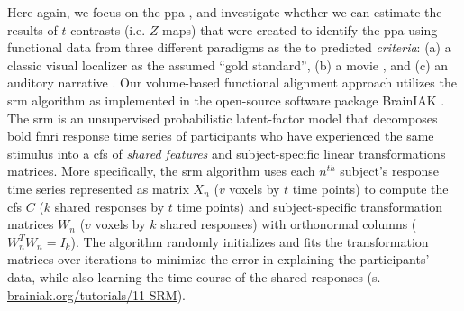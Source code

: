 Here again, we focus on the \ac{ppa} \citep[e.g.,][for
reviews]{epstein2014neural, aminoff2013role}, and investigate whether we can
estimate the results of $t$-contrasts (i.e. $Z$-maps) that were created to
identify the \ac{ppa} using functional data from three different paradigms as
the to predicted \textit{criteria}:
%
(a) a classic visual localizer \citep{sengupta2016extension} as the assumed
``gold standard'',
%
(b) a movie \citep{haeusler2022processing}, and
%
(c) an auditory narrative \citep{haeusler2022processing}.
Our volume-based functional alignment approach utilizes the \ac{srm} algorithm
\citep{chen2015reduced, richard2019fast} as implemented in the open-source
software package BrainIAK \citep[Brain Imaging Analysis Kit;
\href{https://brainiak.org}{\url{brainiak.org}};][]{kumar2020brainiak,
kumar2020brainiaktutorial}.
The \ac{srm} is an unsupervised probabilistic latent-factor model that
decomposes \ac{bold} \ac{fmri} response time series of participants who have
experienced the same stimulus into a \ac{cfs} of \textit{shared features}
\citep[also known as ``\textit{shared feature space}'';][]{chen2015reduced} and
subject-specific linear transformations matrices.
More specifically, the \ac{srm} algorithm uses each $n^{th}$ subject's response
time series represented as matrix $X_{n}$ ({$v$} voxels by $t$ time points) to
compute the \ac{cfs} $C$ ($k$ shared responses by $t$ time points) and
subject-specific transformation matrices $W_{n}$ ($v$ voxels by $k$ shared
responses) with orthonormal columns ($W_{n}^{T}W_{n}=I_{k}$).
The algorithm randomly initializes and fits the transformation matrices over
iterations to minimize the error in explaining the participants' data, while
also learning the time course of the shared responses (s.
\href{https://brainiak.org/tutorials/11-SRM/}{\url{brainiak.org/tutorials/11-SRM}}).
